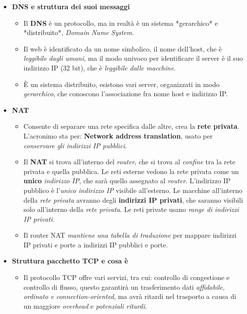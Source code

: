 \begin{itemize}
\begin{itemize}
        \end{itemize}
    \item \textbf{DNS e struttura dei suoi messaggi}
        \begin{itemize}
            \item Il \textbf{DNS} è un protocollo, ma in realtà è un sistema *gerarchico* e *distribuito*, \textit{Domain Name System}.
            \item Il web è identificato da un nome simbolico, il nome dell'host, che è \textit{leggibile dagli umani}, ma il modo univoco per identificare il server è il suo indirizzo IP (32 bit), che è \textit{leggibile dalle macchine}.
            \item È un sistema distribuito, esistono vari server, organizzati in modo \textit{gerarchico}, che conoscono l'associazione fra nome host e indirizzo IP.
        \end{itemize}
    \item \textbf{NAT}
        \begin{itemize}
            \item Consente di separare una rete specifica dalle altre, crea la \textbf{rete privata}. L'acronimo sta per: \textbf{Network address translation}, usato per \textit{conservare gli indirizzi IP pubblici}.
            \item Il \textbf{NAT} si trova all'interno del \textit{router}, che si trova al \textit{confine} tra la rete privata e quella pubblica. Le reti esterne vedono la rete privata come un \textbf{unico} \textit{indirizzo IP}, che sarà quello assegnato al \textit{router}. L'indirizzo IP pubblico è l'\textit{unico indirizzo IP} visibile all'esterno. Le macchine all'interno della \textit{rete privata} avranno degli \textbf{indirizzi IP privati}, che saranno visibili solo all'interno della \textit{rete privata}. Le reti private usano \textit{range di indirizzi IP privati}.
            \item Il router NAT \textit{mantiene una tabella di traduzione} per mappare indirizzi IP privati e porte a indirizzi IP pubblici e porte.
        \end{itemize}
    \item \textbf{Struttura pacchetto TCP e cosa è}
        \begin{itemize}
            \item Il protocollo TCP offre vari servizi, tra cui: controllo di congestione e controllo di flusso, questo garantirà un trasferimento dati \textit{affidabile, ordinato e connection-oriented}, ma avrà ritardi nel trasporto a causa di un maggiore \textit{overhead} e \textit{potenziali ritardi}.

\end{itemize}
\end{itemize}
